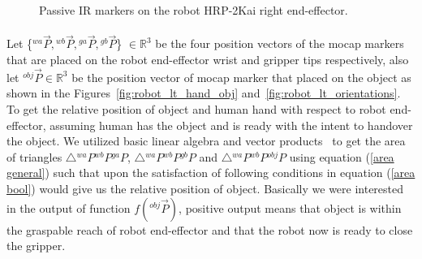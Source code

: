 \documentclass[a4paper, 12pt, oneside]{Thesis}  %
\begin{document}
\begin{figure}[ht]
	\caption{Passive IR markers on the robot HRP-2Kai right end-effector.}
	\label{fig:markerEf}
\end{figure} 

\paragraph*{}
Let \{${}^{wa}\vec P, {}^{wb}\vec P, {}^{ga}\vec P, {}^{gb}\vec P$\} $\in \mathbb{R}^{3}$ be the four position vectors of the mocap markers that are placed on the robot end-effector wrist and gripper tips respectively, also let ${}^{obj}\vec P\in \mathbb{R}^{3}$ be the position vector of mocap marker that placed on the object as shown in the Figures~\ref{fig:robot_lt_hand_obj} and~\ref{fig:robot_lt_orientations}. To get the relative position of object and human hand with respect to robot end-effector, assuming human has the object and is ready with the intent to handover the object. We utilized basic linear algebra and vector products~\cite{brand1947vector, crowe1994history, artin2016geometric} to get the area of triangles $\triangle{{}^{wa}P {}^{wb}P {}^{ga}P}$, $\triangle{{}^{wa}P {}^{wb}P {}^{gb}P}$ and $\triangle{{}^{wa}P {}^{wb}P {}^{obj}P}$ using equation (\ref{area general}) such that upon the satisfaction of following conditions in equation (\ref{area bool}) would give us the relative position of object. Basically we were interested in the output of function $f({}^{obj}\vec{P})$, positive output means that object is within the graspable reach of robot end-effector and that the robot now is ready to close the gripper.
\end{document}
